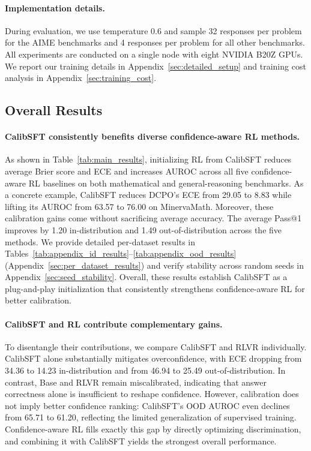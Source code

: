 \documentclass{article} %
\begin{document}
\paragraph{Implementation details.}
During evaluation, we use temperature 0.6 and sample 32 responses per problem
for the AIME benchmarks and 4 responses per problem for all other benchmarks. All experiments are conducted on a
single node with eight NVIDIA B20Z GPUs.  We report our training details in Appendix~\ref{sec:detailed_setup} and training cost analysis in Appendix~\ref{sec:training_cost}.


\subsection{Overall Results}
\label{sec:overall_results}



\paragraph{CalibSFT consistently benefits diverse confidence-aware RL methods.}
As shown in Table~\ref{tab:main_results}, initializing RL from CalibSFT
reduces average Brier score and ECE and increases AUROC across all five confidence-aware RL
baselines on both mathematical and general-reasoning benchmarks.
As a concrete example, CalibSFT reduces DCPO's ECE from 29.05 to 8.83 while lifting its
AUROC from 63.57 to 76.00 on MinervaMath.
Moreover, these calibration gains come without sacrificing average accuracy. The average Pass@1 improves by
1.20 in-distribution and 1.49 out-of-distribution across the five methods.
We provide detailed per-dataset results in Tables~\ref{tab:appendix_id_results}--\ref{tab:appendix_ood_results} (Appendix~\ref{sec:per_dataset_results})
and verify stability across random seeds in Appendix~\ref{sec:seed_stability}.
Overall, these results establish CalibSFT as a plug-and-play initialization that consistently
strengthens confidence-aware RL for better calibration.

\paragraph{CalibSFT and RL contribute complementary gains.}
To disentangle their contributions, we compare CalibSFT and RLVR individually.
CalibSFT alone substantially mitigates overconfidence, with ECE dropping from 34.36 to 14.23 in-distribution and from 46.94 to 25.49 out-of-distribution.
In contrast, Base and RLVR remain miscalibrated, indicating that answer correctness alone is insufficient to reshape confidence.
However, calibration does not imply better confidence ranking: CalibSFT's OOD AUROC even declines from 65.71 to 61.20, reflecting the limited generalization of supervised training.
Confidence-aware RL fills exactly this gap by directly optimizing discrimination, and combining it with CalibSFT yields the strongest overall performance.
\end{document}
